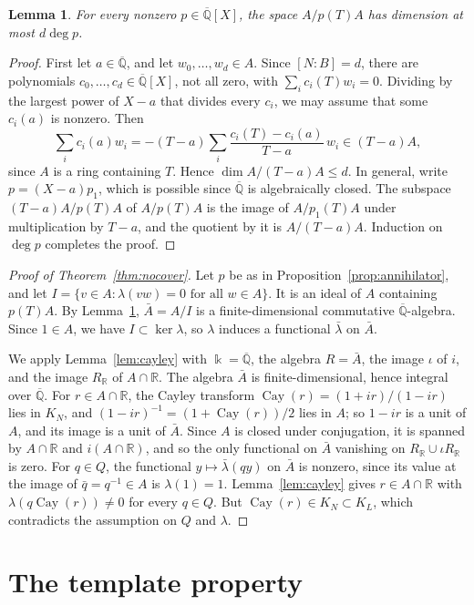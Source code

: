 \documentclass[10pt]{article}
\newtheorem{lem}[thm]{Lemma}
\theoremstyle{remark}
\newcommand{\R}{\mathbb R}
\newcommand{\Qbar}{\overline{\mathbb Q}}
\DeclareMathOperator{\Cay}{Cay}
\begin{document}
\begin{lem}\label{lem:quotient}
For every nonzero $p\in\Qbar[X]$, the space $A/p(T)A$ has dimension at most $d\deg p$.
\end{lem}

\begin{proof}
First let $a\in\Qbar$, and let $w_0,\ldots,w_d\in A$. Since $[N:B]=d$, there are polynomials $c_0,\ldots,c_d\in\Qbar[X]$, not all zero, with $\sum_ic_i(T)w_i=0$. Dividing by the largest power of $X-a$ that divides every $c_i$, we may assume that some $c_i(a)$ is nonzero. Then
\[
 \sum_ic_i(a)w_i=-(T-a)\sum_i\frac{c_i(T)-c_i(a)}{T-a}\,w_i\in(T-a)A,
\]
since $A$ is a ring containing $T$. Hence $\dim A/(T-a)A\le d$. In general, write $p=(X-a)p_1$, which is possible since $\Qbar$ is algebraically closed. The subspace $(T-a)A/p(T)A$ of $A/p(T)A$ is the image of $A/p_1(T)A$ under multiplication by $T-a$, and the quotient by it is $A/(T-a)A$. Induction on $\deg p$ completes the proof.
\end{proof}

\begin{proof}[Proof of Theorem~\ref{thm:nocover}]
Let $p$ be as in Proposition~\ref{prop:annihilator}, and let $I=\{v\in A:\lambda(vw)=0\text{ for all }w\in A\}$. It is an ideal of $A$ containing $p(T)A$. By Lemma~\ref{lem:quotient}, $\bar A=A/I$ is a finite-dimensional commutative $\Qbar$-algebra. Since $1\in A$, we have $I\subset\ker\lambda$, so $\lambda$ induces a functional $\bar\lambda$ on $\bar A$.

We apply Lemma~\ref{lem:cayley} with $\Bbbk=\Qbar$, the algebra $R=\bar A$, the image $\iota$ of $i$, and the image $R_\R$ of $A\cap\R$. The algebra $\bar A$ is finite-dimensional, hence integral over $\Qbar$. For $r\in A\cap\R$, the Cayley transform $\Cay(r)=(1+ir)/(1-ir)$ lies in $K_N$, and $(1-ir)^{-1}=(1+\Cay(r))/2$ lies in $A$; so $1-ir$ is a unit of $A$, and its image is a unit of $\bar A$. Since $A$ is closed under conjugation, it is spanned by $A\cap\R$ and $i(A\cap\R)$, and so the only functional on $\bar A$ vanishing on $R_\R\cup\iota R_\R$ is zero. For $q\in Q$, the functional $y\mapsto\bar\lambda(qy)$ on $\bar A$ is nonzero, since its value at the image of $\bar q=q^{-1}\in A$ is $\lambda(1)=1$. Lemma~\ref{lem:cayley} gives $r\in A\cap\R$ with $\lambda(q\Cay(r))\ne0$ for every $q\in Q$. But $\Cay(r)\in K_N\subset K_L$, which contradicts the assumption on $Q$ and $\lambda$.
\end{proof}

\section{The template property}\label{sec:templates}
\end{document}
